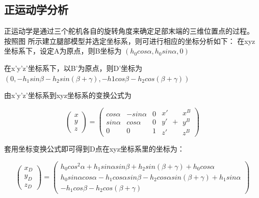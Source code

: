 \documentclass[10pt]{article}
\begin{document}
\subsection{正运动学分析}
正运动学是通过三个舵机各自的旋转角度来确定足部末端的三维位置点的过程。
按照图      所示建立腿部模型并选定坐标系，则可进行相应的坐标分析如下：
在xyz坐标系下，设定A为原点，则B坐标为 $(h_0cos\alpha, h_0sin\alpha, 0)$

在x'y'z'坐标系下，以B'为原点，则D'坐标为 $(0, -h_1sin\beta-h_2sin(\beta+\gamma), -h1cos\beta-h_2cos(\beta+\gamma))$

由x'y'z'坐标系到xyz坐标系的变换公式为

\begin{equation}
	\left(
		\begin{array}{c}
			x \\
			y \\
			z
		\end{array}
	\right)
	=
	\left(
		\begin{array}{ccc}
			cos\alpha & -sin\alpha & 0 \\
			sin\alpha & cos\alpha & 0 \\
			0 & 0 & 1
		\end{array}
		\begin{array}{c}
			x' \\
			y' \\
			z' 	
		\end{array}
		+
		\begin{array}{c}
			x^B \\
			y^B \\
			z^B 	
		\end{array}
	\right)
\end{equation}

套用坐标变换公式即可得到D点在xyz坐标系里的坐标为：

\begin{equation}
	\left(
		\begin{array}{l}
			x_D \\
			y_D \\
			z_D
		\end{array}
	\right)
	=
	\left(
		\begin{array}{l}
			h_0cos^2\alpha+h_1sin\alpha sin\beta+h_2sin(\beta+\gamma)+h_0cos\alpha \\
			h_0sin\alpha cos\alpha - h_1cos\alpha sin\beta - h_2cos\alpha sin(\beta+\gamma)+h_1sin\alpha \\
			-h_1cos\beta - h_2cos(\beta+\gamma)
		\end{array}
	\right)
\end{equation}
\end{document}

